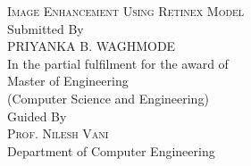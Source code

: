 \begin{titlepage}

\newcommand{\HRule}{\rule{\linewidth}{0.5mm}} %

\center %


\textsc{\normalsize Image Enhancement Using Retinex Model}\\[1.5cm] %
\normalsize Submitted By\\[0.5cm] %
\textsc{\normalsize PRIYANKA B. WAGHMODE}\\[0.5cm] %
\normalsize In the partial fulfilment for the award of \\[1cm]
\normalsize Master of Engineering\\[0.1cm]
\normalsize (Computer Science and Engineering)\\[1cm]
\normalsize Guided By\\[0.5cm]
\textsc{\normalsize Prof. Nilesh Vani}\\[0.25cm]
\normalsize Department of Computer Engineering\\[0.5cm]







\end{titlepage}
